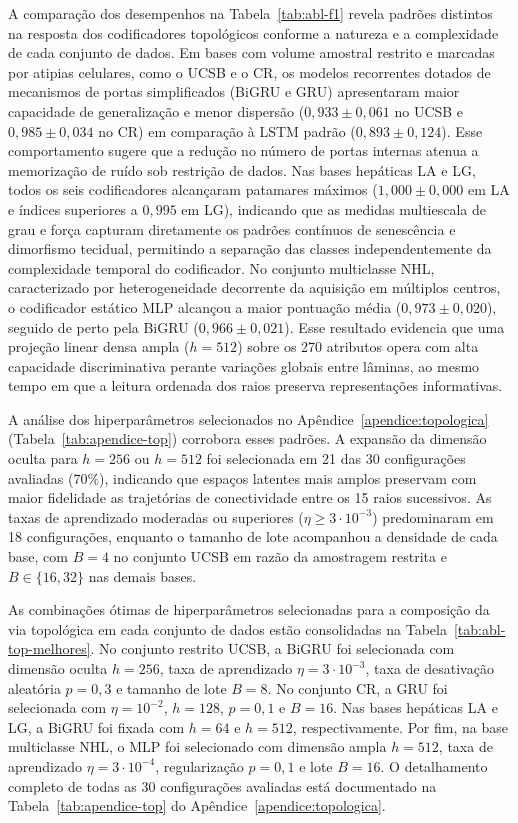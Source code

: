 A comparação dos desempenhos na Tabela~\ref{tab:abl-f1} revela padrões distintos na resposta dos codificadores topológicos conforme a natureza e a complexidade de cada conjunto de dados. Em bases com volume amostral restrito e marcadas por atipias celulares, como o UCSB e o CR, os modelos recorrentes dotados de mecanismos de portas simplificados (BiGRU e GRU) apresentaram maior capacidade de generalização e menor dispersão ($0{,}933 \pm 0{,}061$ no UCSB e $0{,}985 \pm 0{,}034$ no CR) em comparação à LSTM padrão ($0{,}893 \pm 0{,}124$). Esse comportamento sugere que a redução no número de portas internas atenua a memorização de ruído sob restrição de dados. Nas bases hepáticas LA e LG, todos os seis codificadores alcançaram patamares máximos ($1{,}000 \pm 0{,}000$ em LA e índices superiores a $0{,}995$ em LG), indicando que as medidas multiescala de grau e força capturam diretamente os padrões contínuos de senescência e dimorfismo tecidual, permitindo a separação das classes independentemente da complexidade temporal do codificador. No conjunto multiclasse NHL, caracterizado por heterogeneidade decorrente da aquisição em múltiplos centros, o codificador estático MLP alcançou a maior pontuação média ($0{,}973 \pm 0{,}020$), seguido de perto pela BiGRU ($0{,}966 \pm 0{,}021$). Esse resultado evidencia que uma projeção linear densa ampla ($h=512$) sobre os 270 atributos opera com alta capacidade discriminativa perante variações globais entre lâminas, ao mesmo tempo em que a leitura ordenada dos raios preserva representações informativas.

A análise dos hiperparâmetros selecionados no Apêndice~\ref{apendice:topologica} (Tabela~\ref{tab:apendice-top}) corrobora esses padrões. A expansão da dimensão oculta para $h = 256$ ou $h = 512$ foi selecionada em 21 das 30 configurações avaliadas (70\%), indicando que espaços latentes mais amplos preservam com maior fidelidade as trajetórias de conectividade entre os 15 raios sucessivos. As taxas de aprendizado moderadas ou superiores ($\eta \geq 3\cdot 10^{-3}$) predominaram em 18 configurações, enquanto o tamanho de lote acompanhou a densidade de cada base, com $B = 4$ no conjunto UCSB em razão da amostragem restrita e $B \in \{16, 32\}$ nas demais bases.

As combinações ótimas de hiperparâmetros selecionadas para a composição da via topológica em cada conjunto de dados estão consolidadas na Tabela~\ref{tab:abl-top-melhores}. No conjunto restrito UCSB, a BiGRU foi selecionada com dimensão oculta $h = 256$, taxa de aprendizado $\eta = 3\cdot 10^{-3}$, taxa de desativação aleatória $p = 0{,}3$ e tamanho de lote $B = 8$. No conjunto CR, a GRU foi selecionada com $\eta = 10^{-2}$, $h = 128$, $p = 0{,}1$ e $B = 16$. Nas bases hepáticas LA e LG, a BiGRU foi fixada com $h = 64$ e $h = 512$, respectivamente. Por fim, na base multiclasse NHL, o MLP foi selecionado com dimensão ampla $h = 512$, taxa de aprendizado $\eta = 3\cdot 10^{-4}$, regularização $p = 0{,}1$ e lote $B = 16$. O detalhamento completo de todas as 30 configurações avaliadas está documentado na Tabela~\ref{tab:apendice-top} do Apêndice~\ref{apendice:topologica}.

